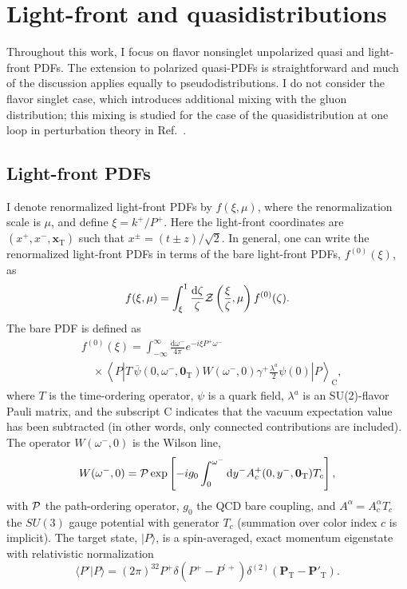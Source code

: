 \section{\label{sec:defns}Light-front and quasidistributions}

Throughout this work, I focus on flavor nonsinglet unpolarized quasi and light-front PDFs. The extension to polarized quasi-PDFs is straightforward and much of the discussion applies equally to pseudodistributions. I do not consider the flavor singlet case, which introduces additional mixing with the gluon distribution; this mixing is studied for the case of the quasidistribution at one loop in perturbation theory in Ref.~\cite{Wang:2017qyg}.

\subsection{Light-front PDFs}

I denote renormalized light-front PDFs by $f(\xi,\mu)$, where the renormalization scale is $\mu$, and define $\xi=k^+/P^+$. Here the light-front coordinates are $(x^+,x^-,\boldsymbol{x}_\mathrm{T})$ such that $x^\pm = (t\pm z)/\sqrt{2}$. In general, one can write the renormalized light-front PDFs in terms of the bare light-front PDFs, $f^{(0)}(\xi)$, as
\begin{equation}
f(\xi,\mu) = \int_\xi^1 \frac{\mathrm{d}\zeta}{\zeta}{\cal
Z}\left(\frac{\xi}{\zeta},\mu\right)f^{(0)}(\zeta).
\end{equation}
The bare PDF is defined as \cite{Collins:2011zzd}
\begin{align}
 {} &f^{(0)}(\xi) = \int_{-\infty}^\infty
\frac{\mathrm{d}\omega^-}{4\pi}
e^{-i\xi P^+\omega^-} \nonumber\\
{} & \quad \times \left\langle P \left|
T\,\overline{\psi}(0,\omega^-,\mathbf{0}_\mathrm{T})
W(\omega^-,0)\gamma^+\frac{\lambda^a}{2}\psi(0) \right|
P\right\rangle_\mathrm{C},
\end{align}
where $T$ is the
time-ordering operator, $\psi$ is a quark
field, $\lambda^a$ is an SU(2)-flavor Pauli matrix, and the subscript C indicates that the vacuum
expectation value has been subtracted (in other words, only connected
contributions are included). The operator $W(\omega^-,0)$ is the Wilson line,
\begin{equation}
W(\omega^-,0) =
{\cal P}\exp\left[-ig_0\int_0^{\omega^-}\mathrm{d}y^-A^+_c(0,y^-,
\mathbf{0}_{\mathrm{T}})T_c\right],
\end{equation}
with ${\cal P}$ the path-ordering operator, $g_0$ the QCD bare coupling,
and $A^\alpha = A^\alpha_c T_c$ the $SU(3)$ gauge potential with generator
$T_c$ (summation over color index $c$ is implicit). The target
state, $|P\rangle$, is a spin-averaged, exact momentum eigenstate with
relativistic normalization
\begin{equation}
\langle P' | P \rangle =
(2\pi)^32P^+\delta\left(P^+-P^{\prime\,+}\right)\delta^{(2)}
\left(\mathbf{P}_\mathrm{T} - \mathbf{P}'_\mathrm{T}\right).
\end{equation}

